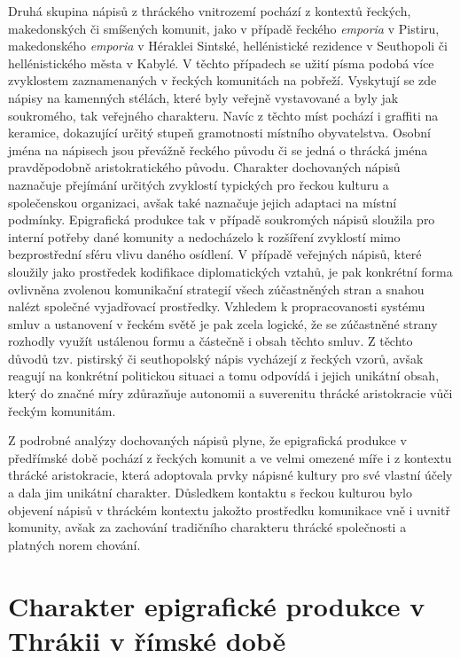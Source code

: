 Druhá skupina nápisů z thráckého vnitrozemí pochází z kontextů řeckých, makedonských či smíšených komunit, jako v případě řeckého {\em emporia} v Pistiru, makedonského {\em emporia} v Héraklei Sintské, hellénistické rezidence v Seuthopoli či hellénistického města v Kabylé. V těchto případech se užití písma podobá více zvyklostem zaznamenaných v řeckých komunitách na pobřeží. Vyskytují se zde nápisy na kamenných stélách, které byly veřejně vystavované a byly jak soukromého, tak veřejného charakteru. Navíc z těchto míst pochází i graffiti na keramice, dokazující určitý stupeň gramotnosti místního obyvatelstva. Osobní jména na nápisech jsou převážně řeckého původu či se jedná o thrácká jména pravděpodobně aristokratického původu. Charakter dochovaných nápisů naznačuje přejímání určitých zvyklostí typických pro řeckou kulturu a společenskou organizaci, avšak také naznačuje jejich adaptaci na místní podmínky. Epigrafická produkce tak v případě soukromých nápisů sloužila pro interní potřeby dané komunity a nedocházelo k rozšíření zvyklostí mimo bezprostřední sféru vlivu daného osídlení. V případě veřejných nápisů, které sloužily jako prostředek kodifikace diplomatických vztahů, je pak konkrétní forma ovlivněna zvolenou komunikační strategií všech zúčastněných stran a snahou nalézt společné vyjadřovací prostředky. Vzhledem k propracovanosti systému smluv a ustanovení v řeckém světě je pak zcela logické, že se zúčastněné strany rozhodly využít ustálenou formu a částečně i obsah těchto smluv. Z těchto důvodů tzv. pistirský či seuthopolský nápis vycházejí z řeckých vzorů, avšak reagují na konkrétní politickou situaci a tomu odpovídá i jejich unikátní obsah, který do značné míry zdůrazňuje autonomii a suverenitu thrácké aristokracie vůči řeckým komunitám.

Z podrobné analýzy dochovaných nápisů plyne, že epigrafická produkce v předřímské době pochází z řeckých komunit a ve velmi omezené míře i z kontextu thrácké aristokracie, která adoptovala prvky nápisné kultury pro své vlastní účely a dala jim unikátní charakter. Důsledkem kontaktu s řeckou kulturou bylo objevení nápisů v thráckém kontextu jakožto prostředku komunikace vně i uvnitř komunity, avšak za zachování tradičního charakteru thrácké společnosti a platných norem chování.

\section[charakter-epigrafické-produkce-v-thrákii-v-římské-době]{Charakter epigrafické produkce v Thrákii v římské době}

